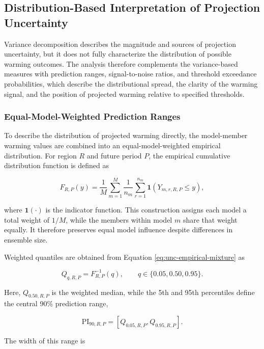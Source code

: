 \documentclass[
]{krantz}
\begin{document}
\subsection{Distribution-Based Interpretation of Projection Uncertainty}\label{distribution-based-interpretation-of-projection-uncertainty}

Variance decomposition describes the magnitude and sources of projection uncertainty, but it does not fully characterize the distribution of possible warming outcomes. The analysis therefore complements the variance-based measures with prediction ranges, signal-to-noise ratios, and threshold exceedance probabilities, which describe the distributional spread, the clarity of the warming signal, and the position of projected warming relative to specified thresholds.

\subsubsection{Equal-Model-Weighted Prediction Ranges}\label{equal-model-weighted-prediction-ranges}

To describe the distribution of projected warming directly, the model-member warming values are combined into an equal-model-weighted empirical distribution. For region \(R\) and future period \(P\), the empirical cumulative distribution function is defined as

\begin{equation}
F_{R,P}(y)
=
\frac{1}{M}
\sum_{m=1}^{M}
\frac{1}{n_m}
\sum_{r=1}^{n_m}
\mathbf{1}
\left(
Y_{m,r,R,P}\le y
\right),
\label{eq:unc-empirical-mixture}
\end{equation}

where \(\mathbf{1}(\cdot)\) is the indicator function. This construction assigns each model a total weight of \(1/M\), while the members within model \(m\) share that weight equally. It therefore preserves equal model influence despite differences in ensemble size.

Weighted quantiles are obtained from Equation \eqref{eq:unc-empirical-mixture} as

\[
Q_{q,R,P}
=
F^{-1}_{R,P}(q),
\qquad
q\in\{0.05,0.50,0.95\}.
\]

Here, \(Q_{0.50,R,P}\) is the weighted median, while the 5th and 95th percentiles define the central 90\% prediction range,

\[
\mathrm{PI}_{90,R,P}
=
\left[
Q_{0.05,R,P},
Q_{0.95,R,P}
\right].
\]

The width of this range is
\end{document}
